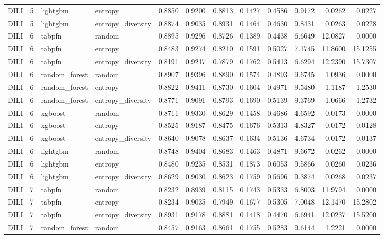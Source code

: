 \begin{tabular}{lrllrrrrrrrr}
DILI & 5 & lightgbm & entropy & 0.8850 & 0.9200 & 0.8813 & 0.1427 & 0.4586 & 9.9172 & 0.0262 & 0.0227 \\
DILI & 5 & lightgbm & entropy_diversity & 0.8874 & 0.9035 & 0.8931 & 0.1464 & 0.4630 & 9.8431 & 0.0263 & 0.0228 \\
DILI & 6 & tabpfn & random & 0.8895 & 0.9296 & 0.8726 & 0.1389 & 0.4438 & 6.6649 & 12.0827 & 0.0000 \\
DILI & 6 & tabpfn & entropy & 0.8483 & 0.9274 & 0.8210 & 0.1591 & 0.5027 & 7.1745 & 11.8600 & 15.1255 \\
DILI & 6 & tabpfn & entropy_diversity & 0.8191 & 0.9217 & 0.7879 & 0.1762 & 0.5413 & 6.6294 & 12.2390 & 15.7307 \\
DILI & 6 & random_forest & random & 0.8907 & 0.9396 & 0.8890 & 0.1574 & 0.4893 & 9.6745 & 1.0936 & 0.0000 \\
DILI & 6 & random_forest & entropy & 0.8822 & 0.9411 & 0.8730 & 0.1604 & 0.4971 & 9.5480 & 1.1187 & 1.2530 \\
DILI & 6 & random_forest & entropy_diversity & 0.8771 & 0.9091 & 0.8793 & 0.1690 & 0.5139 & 9.3769 & 1.0666 & 1.2732 \\
DILI & 6 & xgboost & random & 0.8711 & 0.9330 & 0.8629 & 0.1458 & 0.4686 & 4.6592 & 0.0173 & 0.0000 \\
DILI & 6 & xgboost & entropy & 0.8525 & 0.9187 & 0.8475 & 0.1676 & 0.5313 & 4.8327 & 0.0172 & 0.0128 \\
DILI & 6 & xgboost & entropy_diversity & 0.8640 & 0.9078 & 0.8637 & 0.1634 & 0.5136 & 4.6734 & 0.0172 & 0.0137 \\
DILI & 6 & lightgbm & random & 0.8748 & 0.9404 & 0.8683 & 0.1463 & 0.4871 & 9.6672 & 0.0262 & 0.0000 \\
DILI & 6 & lightgbm & entropy & 0.8480 & 0.9235 & 0.8531 & 0.1873 & 0.6053 & 9.5866 & 0.0260 & 0.0236 \\
DILI & 6 & lightgbm & entropy_diversity & 0.8629 & 0.9030 & 0.8623 & 0.1759 & 0.5696 & 9.3874 & 0.0268 & 0.0237 \\
DILI & 7 & tabpfn & random & 0.8232 & 0.8939 & 0.8115 & 0.1743 & 0.5333 & 6.8003 & 11.9794 & 0.0000 \\
DILI & 7 & tabpfn & entropy & 0.8234 & 0.9035 & 0.7949 & 0.1677 & 0.5305 & 7.0048 & 12.1470 & 15.2802 \\
DILI & 7 & tabpfn & entropy_diversity & 0.8931 & 0.9178 & 0.8881 & 0.1418 & 0.4470 & 6.6941 & 12.0237 & 15.5200 \\
DILI & 7 & random_forest & random & 0.8457 & 0.9163 & 0.8661 & 0.1755 & 0.5283 & 9.6144 & 1.2221 & 0.0000 \\

\end{tabular}
